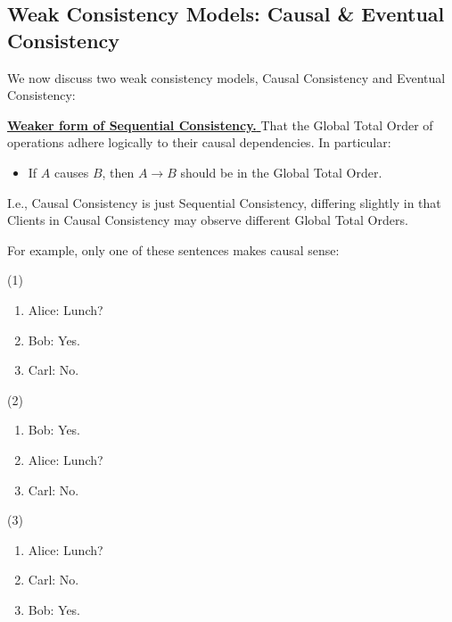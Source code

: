 \subsection{Weak Consistency Models: Causal \& Eventual Consistency}

We now discuss two weak consistency models, Causal Consistency and Eventual Consistency:

\begin{Def}
    
    \underline{\textbf{Weaker form of Sequential Consistency.} }That the Global Total Order of operations adhere logically to their causal dependencies.
    In particular: 
    \begin{itemize}
        \item If $A$ causes $B$, then $A \rightarrow B$ should be in the Global Total Order.
    \end{itemize}
    \noindent
    I.e., Causal Consistency is just Sequential Consistency, differing slightly in that Clients in Causal Consistency may observe different Global Total Orders.
\end{Def}

\noindent
For example, only one of these sentences makes causal sense:

\begin{center}
\begin{minipage}{0.30\textwidth}

    \noindent
(1)
\begin{enumerate}
    \item Alice: Lunch?
    \item Bob: Yes.
    \item Carl: No.
\end{enumerate}
\end{minipage}
\begin{minipage}{0.30\textwidth}
(2)
\begin{enumerate}
    \item Bob: Yes.
    \item Alice: Lunch?
    \item Carl: No.
\end{enumerate}
\end{minipage}
\begin{minipage}{0.30\textwidth}
    (3)
    \begin{enumerate}
        \item Alice: Lunch?
        \item Carl: No.
        \item Bob: Yes.
    \end{enumerate}
    \end{minipage}
\end{center}

